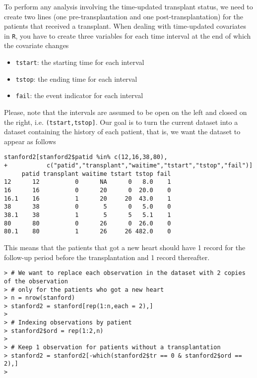 \begin{enumerate}[(a)]
\begin{enumerate}[(i)]
To perform any analysis involving the time-updated transplant
status, we need to create two lines (one pre-transplantation and one
post-transplantation) for the patients that received a transplant. When dealing with time-updated covariates in \verb|R|, you have to create three variables for each time interval at the end of which the covariate changes
\begin{itemize}
\item \verb|tstart|: the starting time for each interval
\item \verb|tstop|: the ending time for each interval
\item \verb|fail|: the event indicator for each interval
\end{itemize}  
Please, note that the intervals are assumed to be open on the left and closed on the right, i.e. \verb|(tstart,tstop]|. Our goal is to turn the current dataset into a dataset containing the history of each patient, that is, we want the dataset to appear as follows
\begin{spacing}{1.2}
\begin{footnotesize}
\begin{verbatim}
stanford2[stanford2$patid %in% c(12,16,38,80),
+           c("patid","transplant","waitime","tstart","tstop","fail")]
     patid transplant waitime tstart tstop fail
12      12          0      NA      0   8.0    1
16      16          0      20      0  20.0    0
16.1    16          1      20     20  43.0    1
38      38          0       5      0   5.0    0
38.1    38          1       5      5   5.1    1
80      80          0      26      0  26.0    0
80.1    80          1      26     26 482.0    0
\end{verbatim}
\end{footnotesize}
\end{spacing}
This means that the patients that got a new heart should have 1 record for the follow-up period before the transplantation and 1 record thereafter.
\begin{spacing}{1.2}
\begin{footnotesize}
\begin{verbatim}
> # We want to replace each observation in the dataset with 2 copies of the observation
> # only for the patients who got a new heart
> n = nrow(stanford)
> stanford2 = stanford[rep(1:n,each = 2),]
> 
> # Indexing observations by patient
> stanford2$ord = rep(1:2,n)
> 
> # Keep 1 observation for patients without a transplantation
> stanford2 = stanford2[-which(stanford2$tr == 0 & stanford2$ord == 2),]
> 

\end{verbatim}
\end{footnotesize}
\end{spacing}
\end{enumerate}
\end{enumerate}
